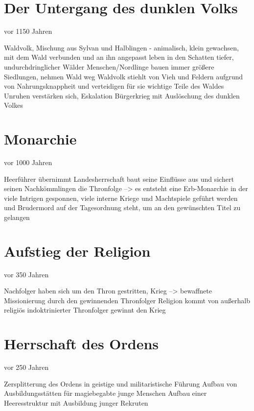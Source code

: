 \section{Der Untergang des dunklen Volks}
vor 1150 Jahren
\begin{outline}
	\1 Waldvolk, Mischung aus Sylvan und Halblingen - animalisch, klein gewachsen, mit dem Wald verbunden und an ihn angepasst
	\1 leben in den Schatten tiefer, undurchdringlicher Wälder
	\1 Menschen/Nordlinge bauen immer größere Siedlungen, nehmen Wald weg
	\1 Waldvolk stiehlt von Vieh und Feldern aufgrund von Nahrungsknappheit und verteidigen für sie wichtige Teile des Waldes
	\1 Unruhen verstärken sich, Eskalation
	\1 Bürgerkrieg mit Auslöschung des dunklen Volkes
\end{outline}

\section{Monarchie}
vor 1000 Jahren
\begin{outline}
	\1 Heerführer übernimmt Landesherrschaft
	\1 baut seine Einflüsse aus und sichert seinen Nachkömmlingen die Thronfolge --> es entsteht eine Erb-Monarchie in der viele Intrigen gesponnen, viele interne Kriege und Machtspiele geführt werden und Brudermord auf der Tagesordnung steht, um an den gewünschten Titel zu gelangen
\end{outline}

\section{Aufstieg der Religion}
vor 350 Jahren
\begin{outline}
	\1 Nachfolger haben sich um den Thron gestritten, Krieg --> bewaffnete Missionierung durch den gewinnenden Thronfolger
	\1 Religion kommt von außerhalb
	\1 religiös indoktrinierter Thronfolger gewinnt den Krieg
\end{outline}

\section{Herrschaft des Ordens}
vor 250 Jahren
\begin{outline}
	\1 Zersplitterung des Ordens in geistige und militaristische Führung
	\1 Aufbau von Ausbildungsstätten für magiebegabte junge Menschen
	\1 Aufbau einer Heeresstruktur mit Ausbildung junger Rekruten
\end{outline}


